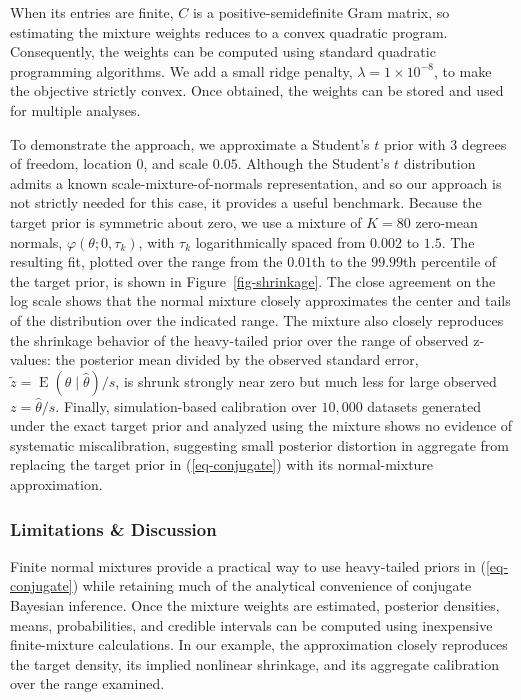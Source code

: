 \documentclass[11pt,letterpaper]{article}
\begin{document}
When its entries are finite, $C$ is a positive-semidefinite Gram matrix,
so estimating the mixture weights reduces to a convex quadratic program.
Consequently, the weights can be computed using standard quadratic
programming algorithms. We add a small ridge penalty,
$\lambda=1\times10^{-8}$, to make the objective strictly convex. Once obtained, the weights can be stored and used for multiple analyses.

To demonstrate the approach, we approximate a Student's $t$ prior with 3
degrees of freedom, location $0$, and scale $0.05$. Although the Student's
$t$ distribution admits a known scale-mixture-of-normals representation,
and so our approach is not strictly needed for this case, it provides a
useful benchmark. Because the target prior is symmetric about zero, we use a mixture of
$K=80$ zero-mean normals, $\varphi(\theta;0,\tau_k)$, with
$\tau_k$ logarithmically spaced from $0.002$ to $1.5$. The resulting fit,
plotted over the range from the $0.01$th to the $99.99$th percentile of
the target prior, is shown in Figure~\ref{fig-shrinkage}. The close
agreement on the log scale shows that the normal mixture closely
approximates the center and tails of the distribution over the indicated range.
The mixture also closely reproduces the
shrinkage behavior of the heavy-tailed prior over the range of observed
z-values: the posterior mean divided by the observed standard error,
$\tilde z = \operatorname{E}(\theta \mid \hat\theta)/s$, is shrunk
strongly near zero but much less for large observed $z = \hat\theta/s$.
Finally, simulation-based calibration over $10{,}000$ datasets
generated under the exact target prior and analyzed using the mixture
shows no evidence of systematic miscalibration, suggesting small posterior
distortion in aggregate from replacing the target prior in (\ref{eq-conjugate}) with its
normal-mixture approximation.


\subsubsection{Limitations \& Discussion}\label{limitations-discussion}

Finite normal mixtures provide a practical way to use heavy-tailed priors in (\ref{eq-conjugate}) while retaining much of the analytical convenience of conjugate Bayesian inference. Once the mixture weights are estimated, posterior densities, means, probabilities, and credible intervals can be computed using inexpensive finite-mixture calculations. In our example, the approximation closely reproduces the target density, its implied nonlinear shrinkage, and its aggregate calibration over the range examined.
\end{document}
